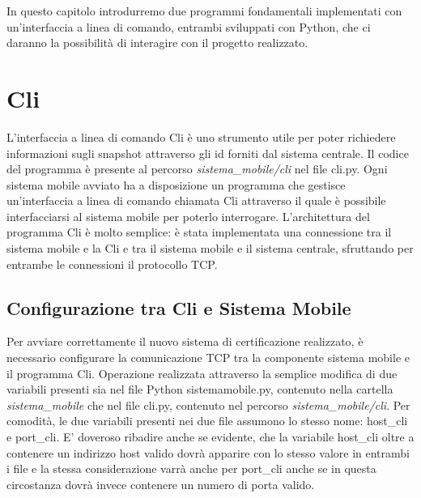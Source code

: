 In questo capitolo introdurremo due programmi fondamentali implementati con un'interfaccia a linea di comando, entrambi sviluppati con Python, che ci daranno la possibilità di interagire con il progetto realizzato.

\section{Cli}\label{capitolo_cli}
L'interfaccia a linea di comando Cli è uno strumento utile per poter richiedere informazioni sugli snapshot attraverso gli id forniti dal sistema centrale. Il codice del programma è presente al percorso \textit{sistema\_mobile/cli} nel file cli.py. Ogni sistema mobile avviato ha a disposizione un programma che gestisce un'interfaccia a linea di comando chiamata Cli attraverso il quale è possibile interfacciarsi al sistema mobile per poterlo interrogare. L'architettura del programma Cli è molto semplice: è stata implementata una connessione tra il sistema mobile e la Cli e tra il sistema mobile e il sistema centrale, sfruttando per entrambe le connessioni il protocollo TCP.

\subsection{Configurazione tra Cli e Sistema Mobile}
Per avviare correttamente il nuovo sistema di certificazione realizzato, è necessario configurare la comunicazione TCP tra la componente sistema mobile e il programma Cli. Operazione realizzata attraverso la semplice modifica di due variabili presenti sia nel file Python sistemamobile.py, contenuto nella cartella \textit{sistema\_mobile} che nel file cli.py, contenuto nel percorso \textit{sistema\_mobile/cli}. Per comodità, le due variabili presenti nei due file assumono lo stesso nome: host\_cli e port\_cli. E' doveroso ribadire anche se evidente, che la variabile host\_cli oltre a contenere un indirizzo host valido dovrà apparire con lo stesso valore in entrambi i file e la stessa considerazione varrà anche per port\_cli anche se in questa circostanza dovrà invece contenere un numero di porta valido.
